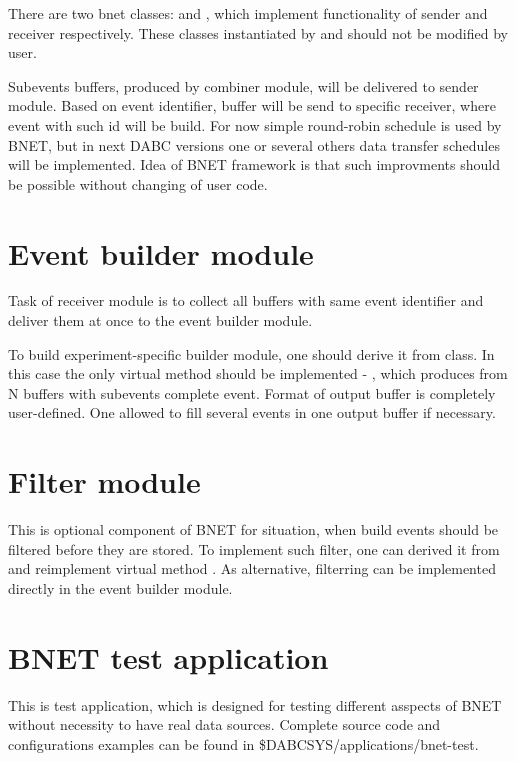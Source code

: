 There are two bnet classes:  and ,
which implement functionality of sender and receiver respectively. 
These classes instantiated by
 and should not be modified by user.     

Subevents buffers, produced by combiner module, will be delivered 
to sender module. Based on event identifier, buffer will be 
send to specific receiver, where event with such id will be build. 
For now simple round-robin schedule is used by BNET, but in next DABC versions
one or several others data transfer schedules will be implemented.
Idea of BNET framework is that such improvments should be possible without
changing of user code.  


\section{Event builder module}

Task of receiver module is to collect all buffers with same event identifier and
deliver them at once to the event builder module.

To build experiment-specific builder module, one should derive it from
 class. In this case the only virtual method
should be implemented - , which produces from N buffers with subevents
complete event. Format of output buffer is completely user-defined. 
One allowed to fill several events in one output buffer if necessary.    


\section{Filter module}

This is optional component of BNET for situation, when build events should be filtered
before they are stored. To implement such filter, 
one can derived it from  and reimplement virtual method
. As alternative, filterring can be implemented directly in the 
event builder module.  


\section{BNET test application}

This is test application, which is designed for testing different asspects of BNET
without necessity to have real data sources. Complete source code and configurations 
examples can be found in \$DABCSYS/applications/bnet-test.  

